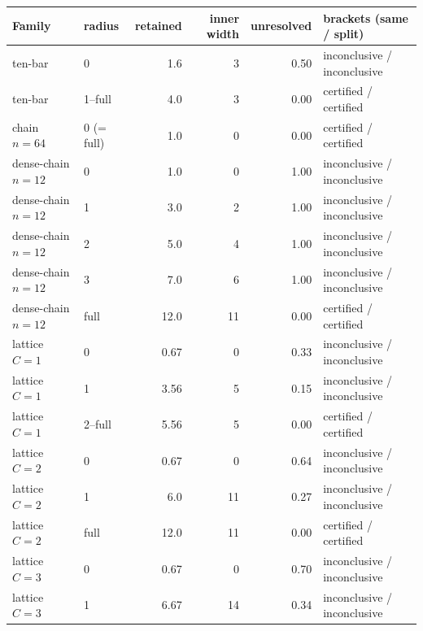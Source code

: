 \documentclass[11pt]{article}
\theoremstyle{plain}
\theoremstyle{definition}
\theoremstyle{remark}
\begin{document}
\begin{center}
\begin{tabular}{@{}llrrrl@{}}
\toprule
Family & radius & retained & inner width & unresolved & brackets (same / split)\\
\midrule
ten-bar & 0 & 1.6 & 3 & 0.50 & inconclusive / inconclusive\\
ten-bar & 1--full & 4.0 & 3 & 0.00 & certified / certified\\
chain \(n{=}64\) & 0 (= full) & 1.0 & 0 & 0.00 & certified / certified\\
dense-chain \(n{=}12\) & 0 & 1.0 & 0 & 1.00 & inconclusive / inconclusive\\
dense-chain \(n{=}12\) & 1 & 3.0 & 2 & 1.00 & inconclusive / inconclusive\\
dense-chain \(n{=}12\) & 2 & 5.0 & 4 & 1.00 & inconclusive / inconclusive\\
dense-chain \(n{=}12\) & 3 & 7.0 & 6 & 1.00 & inconclusive / inconclusive\\
dense-chain \(n{=}12\) & full & 12.0 & 11 & 0.00 & certified / certified\\
lattice \(C{=}1\) & 0 & 0.67 & 0 & 0.33 & inconclusive / inconclusive\\
lattice \(C{=}1\) & 1 & 3.56 & 5 & 0.15 & inconclusive / inconclusive\\
lattice \(C{=}1\) & 2--full & 5.56 & 5 & 0.00 & certified / certified\\
lattice \(C{=}2\) & 0 & 0.67 & 0 & 0.64 & inconclusive / inconclusive\\
lattice \(C{=}2\) & 1 & 6.0 & 11 & 0.27 & inconclusive / inconclusive\\
lattice \(C{=}2\) & full & 12.0 & 11 & 0.00 & certified / certified\\
lattice \(C{=}3\) & 0 & 0.67 & 0 & 0.70 & inconclusive / inconclusive\\
lattice \(C{=}3\) & 1 & 6.67 & 14 & 0.34 & inconclusive / inconclusive\\
\bottomrule
\end{tabular}
\label{tab:sparsification-study}
\end{center}
\end{document}

